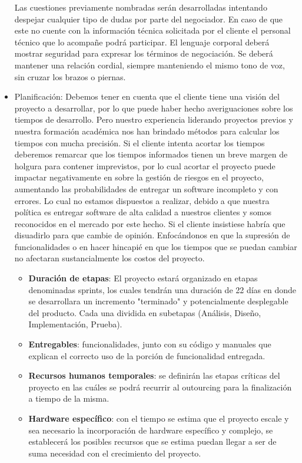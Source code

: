 \begin{itemize}
Las cuestiones previamente nombradas serán desarrolladas intentando despejar cualquier tipo de dudas por parte del negociador.
En caso de que este no cuente con la información técnica solicitada por el cliente el personal técnico que lo acompañe podrá participar.
El lenguaje corporal deberá mostrar seguridad para expresar los términos de negociación. 
Se deberá mantener una relación cordial, siempre manteniendo el mismo tono de voz, sin cruzar los brazos o piernas.

	\item Planificación: Debemos tener en cuenta que el cliente tiene una visión del proyecto a desarrollar, por lo que puede haber hecho averiguaciones sobre los tiempos de desarrollo.
Pero nuestro experiencia liderando proyectos previos y nuestra formación académica nos han brindado métodos para calcular los tiempos con mucha precisión.
Si el cliente intenta acortar los tiempos deberemos remarcar que los tiempos informados tienen un breve margen de holgura para contener imprevistos, por lo cual acortar el proyecto puede impactar negativamente en sobre la gestión de riesgos en el proyecto, aumentando las probabilidades de entregar un software incompleto y con errores.
Lo cual no estamos dispuestos a realizar, debido a que nuestra política es entregar software de alta calidad a nuestros clientes y somos reconocidos en el mercado por este hecho.
Si el cliente insistiese habría que disuadirlo para que cambie de opinión.
Enfocándonos en que la supresión de funcionalidades o en hacer hincapié en que los tiempos que se puedan cambiar no afectaran sustancialmente los costos del proyecto.
	\begin{itemize}
		\item \textbf{Duración de etapas}: El proyecto estará organizado en etapas denominadas sprints, los cuales tendrán una duración de 22 días en donde se desarrollara un incremento "terminado" y potencialmente desplegable del producto. Cada una dividida en subetapas (Análisis, Diseño, Implementación, Prueba).
        \item \textbf{Entregables}: funcionalidades, junto con su código y manuales que explican el correcto uso de la porción de funcionalidad entregada.
        \item \textbf{Recursos humanos temporales}: se definirán las etapas críticas del proyecto en las cuáles se podrá recurrir al outourcing para la finalización a tiempo de la misma.
        \item \textbf{Hardware específico}: con el tiempo se estima que el proyecto escale y sea necesario la incorporación de hardware específico y complejo, se establecerá los posibles recursos que se estima puedan llegar a ser de suma necesidad con el crecimiento del proyecto.
	\end{itemize}
    

\end{itemize}

